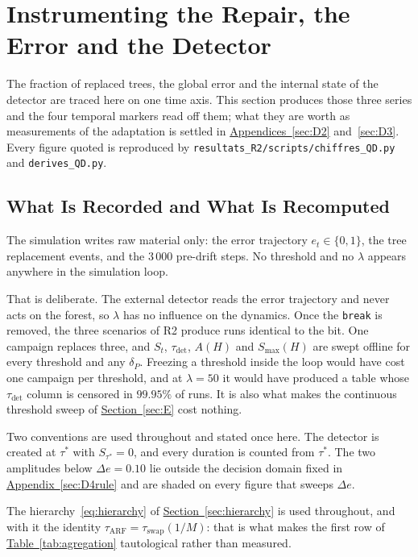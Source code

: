 \documentclass[10pt,conference]{IEEEtran}
\theoremstyle{definition}
\begin{document}
\section{Instrumenting the Repair, the Error and the Detector}
\label{sec:D1}

The fraction of replaced trees, the global error and the internal state of the detector
are traced here on one time axis. This section produces those three series and
the four temporal markers read off them; what they are worth as measurements of the
adaptation is settled in \hyperref[sec:D2]{Appendices~\ref*{sec:D2}} and~\ref{sec:D3}. Every figure quoted is
reproduced by \texttt{resultats\_R2/scripts/chiffres\_QD.py} and \texttt{derives\_QD.py}.

\subsection{What Is Recorded and What Is Recomputed}

The simulation writes raw material only: the error trajectory $e_t \in \{0,1\}$, the tree
replacement events, and the $3\,000$ pre-drift steps. No threshold and no $\lambda$
appears anywhere in the simulation loop.

That is deliberate. The external detector reads the error trajectory and never acts on
the forest, so $\lambda$ has no influence on the dynamics. Once the \texttt{break} is
removed, the three scenarios of R2 produce runs identical to the bit. One campaign
replaces three, and $S_t$, $\tau_{\mathrm{det}}$, $A(H)$ and $S_{\max}(H)$ are swept
offline for every threshold and any $\delta_P$. Freezing a threshold inside the loop
would have cost one campaign per threshold, and at $\lambda = 50$ it would have produced
a table whose $\tau_{\mathrm{det}}$ column is censored in $99.95\%$ of runs. It is also
what makes the continuous threshold sweep of \hyperref[sec:E]{Section~\ref*{sec:E}} cost nothing.

Two conventions are used throughout and stated once here. The detector is created at
$\tau^*$ with $S_{\tau^*} = 0$, and every duration is counted from $\tau^*$. The two
amplitudes below $\Delta e = 0.10$ lie outside the decision domain fixed in
\hyperref[sec:D4rule]{Appendix~\ref*{sec:D4rule}} and are shaded on every figure that sweeps $\Delta e$.

The hierarchy~\eqref{eq:hierarchy} of \hyperref[sec:hierarchy]{Section~\ref*{sec:hierarchy}} is used throughout,
and with it the identity $\tau_{\mathrm{ARF}} = \tau_{\mathrm{swap}}(1/M)$: that is what
makes the first row of \hyperref[tab:agregation]{Table~\ref*{tab:agregation}} tautological rather than measured.
\end{document}
